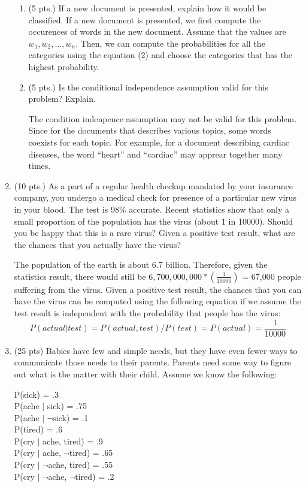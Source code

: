 \documentclass{article}%
\begin{document}
\begin{enumerate}
\begin{enumerate}
  		
  		\item (5 pts.) If a new document is presented, explain how it would be classified.
  		If a new document is presented, we first compute the occurences of words in the new document. Assume that the values are $w_1, w_2, \ldots, w_n$. Then, we can compute the probabilities for all the categories using the equation (2) and choose the categories that has the highest probability.
  		
		\item (5 pts.) Is the conditional independence assumption valid for this problem? Explain. 
		
		The condition indenpence assumption may not be valid for this problem. Since for the documents that describes various topics, some words coexists for each topic. For example, for a document describing cardiac diseases, the word ``heart'' and ``cardiac'' may apprear together many times. 
	\end{enumerate}

\item (10 pts.) As a part of a regular health checkup mandated by your insurance company, you undergo a medical check for presence of a particular new virus in your blood. The test is 98\% accurate. Recent statistics show that only a small proportion of the population has the virus (about 1 in 10000). Should you be happy that this is a rare virus? Given a positive test result, what are the chances that you actually have the virus? 

	The population of the earth is about 6.7 billion. Therefore, given the statistics result, there would still be $6,700,000,000 * (\frac{1}{10000})$ =  67,000 people suffering from the virus. Given a positive test result, the chances that you can have the virus can be computed using the following equation if we assume the test result is independent with the probability that people has the virus: 
	\[
	P(actual | test) = P(actual,test)/P(test) = P(actual) = \frac{1}{10000}
	\]


\item (25 pts) Babies have few and simple needs, but they have even fewer ways to communicate those needs to their parents. Parents need some way to figure out what is the matter with their child. Assume we know the following:

P(sick) = .3 \\
P(ache $|$ sick) = .75\\
P(ache $|$ $\neg$sick) = .1\\
P(tired) = .6\\
P(cry $|$ ache, tired) = .9\\
P(cry $|$ ache, $\neg$tired) = .65\\
P(cry $|$ $\neg$ache, tired) = .55\\
P(cry $|$ $\neg$ache, $\neg$tired) = .2\\


\end{enumerate}
\end{document}
